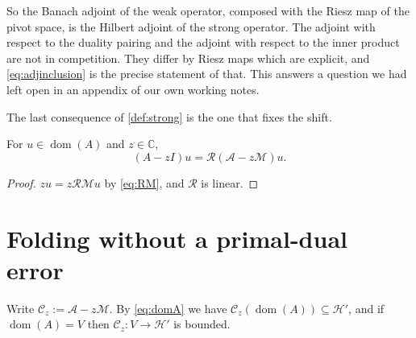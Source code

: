\documentclass[11pt,a4paper]{article}
\theoremstyle{plain}
\newcommand{\C}{\mathbb{C}}
\newcommand{\Hb}{\mathcal{H}}
\newcommand{\Vb}{V}
\newcommand{\Aop}{\mathcal{A}}
\DeclareMathOperator{\dom}{dom}
\newcommand{\Riesz}{\mathcal{R}}         %
\newcommand{\Mass}{\mathcal{M}}          %
\begin{document}
So the Banach adjoint of the weak operator, composed with the Riesz map of the
pivot space, is the Hilbert adjoint of the strong operator.  The adjoint with
respect to the duality pairing and the adjoint with respect to the inner product
are not in competition.  They differ by Riesz maps which are explicit, and
\cref{eq:adjinclusion} is the precise statement of that.  This answers a
question we had left open in an appendix of our own working notes.

The last consequence of \cref{def:strong} is the one that fixes the shift.

\begin{corollary}
  \label{cor:shift}
  For $u \in \dom(A)$ and $z \in \C$,
  \begin{equation}
    \label{eq:shift}
    (A - zI)u = \Riesz(\Aop - z\Mass)u .
  \end{equation}
\end{corollary}

\begin{proof}
  $zu = z\Riesz\Mass u$ by \cref{eq:RM}, and $\Riesz$ is linear.
\end{proof}

\section{Folding without a primal-dual error}
\label{sec:folding}

Write $\mathcal{C}_z := \Aop - z\Mass$.  By \cref{eq:domA} we have
$\mathcal{C}_z(\dom(A)) \subseteq \Hb'$, and if $\dom(A) = \Vb$ then
$\mathcal{C}_z \colon \Vb \to \Hb'$ is bounded.
\end{document}
